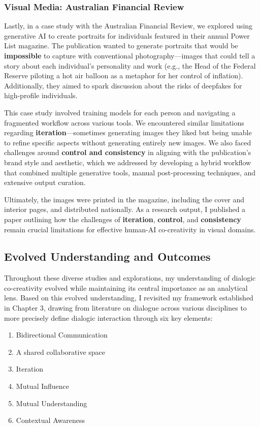 \subsubsection{Visual Media: Australian Financial Review}

Lastly, in a case study with the Australian Financial Review, we explored using generative AI to create portraits for individuals featured in their annual Power List magazine. The publication wanted to generate portraits that would be \textbf{impossible} to capture with conventional photography—images that could tell a story about each individual's personality and work (e.g., the Head of the Federal Reserve piloting a hot air balloon as a metaphor for her control of inflation). Additionally, they aimed to spark discussion about the risks of deepfakes for high-profile individuals.

This case study involved training models for each person and navigating a fragmented workflow across various tools. We encountered similar limitations regarding \textbf{iteration}—sometimes generating images they liked but being unable to refine specific aspects without generating entirely new images. We also faced challenges around \textbf{control and consistency} in aligning with the publication's brand style and aesthetic, which we addressed by developing a hybrid workflow that combined multiple generative tools, manual post-processing techniques, and extensive output curation.

Ultimately, the images were printed in the magazine, including the cover and interior pages, and distributed nationally. As a research output, I published a paper outlining how the challenges of \textbf{iteration}, \textbf{control}, and \textbf{consistency} remain crucial limitations for effective human-AI co-creativity in visual domains.

\subsection{Evolved Understanding and Outcomes}

Throughout these diverse studies and explorations, my understanding of dialogic co-creativity evolved while maintaining its central importance as an analytical lens. Based on this evolved understanding, I revisited my framework established in Chapter 3, drawing from literature on dialogue across various disciplines to more precisely define dialogic interaction through six key elements:

\begin{enumerate}
    \item Bidirectional Communication
    \item A shared collaborative space
    \item Iteration
    \item Mutual Influence
    \item Mutual Understanding
    \item Contextual Awareness
\end{enumerate}

